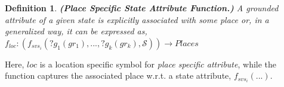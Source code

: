 \documentclass[letterpaper]{article} %
\newtheorem{definition}{Definition}
\begin{document}



\begin{definition}
    \textbf{(Place Specific State Attribute Function.)} A 
    {\em grounded} 
    attribute of a given state is explicitly associated with some {\em place}
    or, in a generalized way, it can be expressed as, 
    $f_{loc}: (f_{svs_i}(?g_1(gr_1),...,?g_k(gr_k),\mathcal{S})) \rightarrow Places$
    \label{def:pssav}
\end{definition}
Here, $\mathit{loc}$ is a location specific symbol for {\em place specific attribute}, while the function captures the associated place w.r.t. a state attribute, $f_{svs_i}(...)$.
\end{document}
